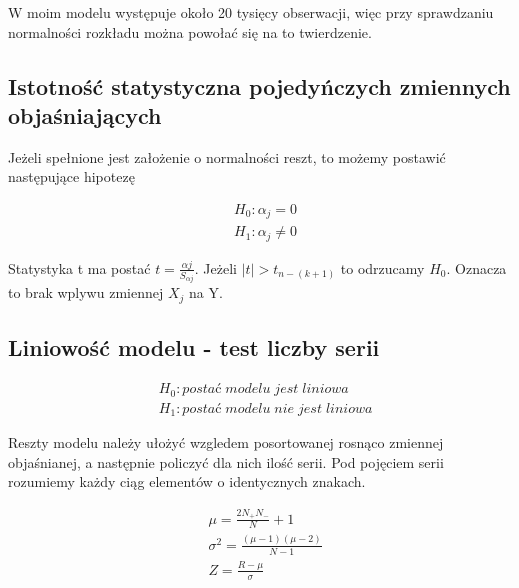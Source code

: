 W moim modelu występuje około 20 tysięcy obserwacji, więc przy sprawdzaniu normalności rozkładu można powołać się na to twierdzenie.

\subsection{Istotność statystyczna pojedyńczych zmiennych objaśniających}\label{subsec:istotność-statystyczna-zmiennych-objaśniających}
Jeżeli spełnione jest założenie o normalności reszt, to możemy postawić następujące hipotezę

\begin{equation}
    \begin{split}
        &H_0: \alpha_j = 0 \\
        &H_1: \alpha_j \ne 0
    \end{split}
\end{equation}

Statystyka t ma postać \(t = \frac{\alpha j}{S_{\alpha j}}\).
Jeżeli \(|t| > t_{n -(k+1)}\) to odrzucamy \(H_0\).
Oznacza to brak wplywu zmiennej \(X_j\) na Y.

\subsection{Liniowość modelu - test liczby serii}\label{subsec:liniowość-modelu---test-liczby-serii}

\begin{equation}
    \begin{split}
        &H_0: postać \; modelu \; jest \; liniowa \\
        &H_1: postać \; modelu \; nie \; jest \; liniowa
    \end{split}
\end{equation}

Reszty modelu należy ułożyć wzgledem posortowanej rosnąco zmiennej objaśnianej, a następnie policzyć dla nich ilość serii.
Pod pojęciem serii rozumiemy każdy ciąg elementów o identycznych znakach.

\begin{equation}
    \begin{split}
        &\mu = \frac{2N_+ N_-}{N} +1 \\
        &\sigma^2 = \frac{(\mu -1)(\mu-2)}{N-1} \\
        &Z = \frac{R - \mu}{\sigma}
    \end{split}
\end{equation}


